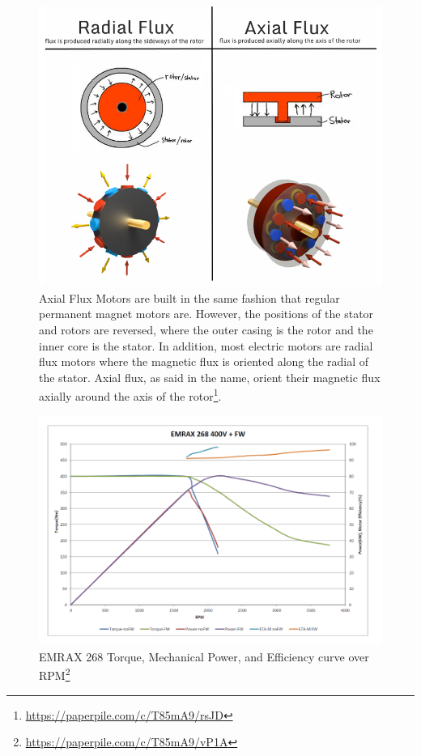 \documentclass[main.tex]{subfiles}
\begin{document}
    \begin{figure}
        \centering
        \includegraphics[width=\textwidth]{images/fig6}
        \caption{Axial Flux Motors are built in the same fashion that regular permanent magnet motors are. However, the positions of the stator and rotors are reversed, where the outer casing is the rotor and the inner core is the stator. In addition, most electric motors are radial flux motors where the magnetic flux is oriented along the radial of the stator. Axial flux, as said in the name, orient their magnetic flux axially around the axis of the rotor\protect\footnote{\url{https://paperpile.com/c/T85mA9/rsJD}}.}
        \label{fig:axial-vs-radial}
    \end{figure}
    \begin{figure}
        \centering
        \includegraphics[width=\textwidth]{images/fig7}
        \caption{EMRAX 268 Torque, Mechanical Power, and Efficiency curve over RPM\protect\footnote{\url{https://paperpile.com/c/T85mA9/vP1A}}}
        \label{fig:emrax-efficiency}
    \end{figure}
\end{document}
